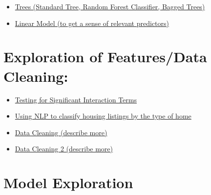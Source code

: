 \documentclass[11pt]{article}
\providecommand{\tightlist}{%
      \setlength{\itemsep}{0pt}\setlength{\parskip}{0pt}}
\begin{document}
\begin{itemize}
\tightlist
\item
  \href{https://github.com/bfine9618/ese305FinalProject/blob/master/Initial\%20models/Trees.ipynb}{Trees
  (Standard Tree, Random Forest Classifier, Bagged Trees)}
\item
  \href{https://github.com/bfine9618/ese305FinalProject/blob/master/Initial\%20models/linear_model.ipynb}{Linear
  Model (to get a sense of relevant predictors)}
\end{itemize}

\section{Exploration of Features/Data
Cleaning:}\label{exploration-of-featuresdata-cleaning}

\begin{itemize}
\tightlist
\item
  \href{https://github.com/bfine9618/ese305FinalProject/blob/master/Initial\%20models/exploring_interaction_terms.ipynb}{Testing
  for Significant Interaction Terms}
\item
  \href{https://github.com/bfine9618/ese305FinalProject/blob/master/Initial\%20cleaning/NLP.ipynb}{Using
  NLP to classify housing listings by the type of home}
\item
  \href{https://github.com/bfine9618/ese305FinalProject/blob/master/Initial\%20cleaning/Data\%20Cleaning\%20and\%20Pre-Processing.ipynb}{Data
  Cleaning (describe more)}
\item
  \href{https://github.com/bfine9618/ese305FinalProject/blob/master/Initial\%20cleaning/Merge\%20Data\%20Files.ipynb}{Data
  Cleaning 2 (describe more)}
\end{itemize}

\section{Model Exploration}\label{model-exploration}
\end{document}
